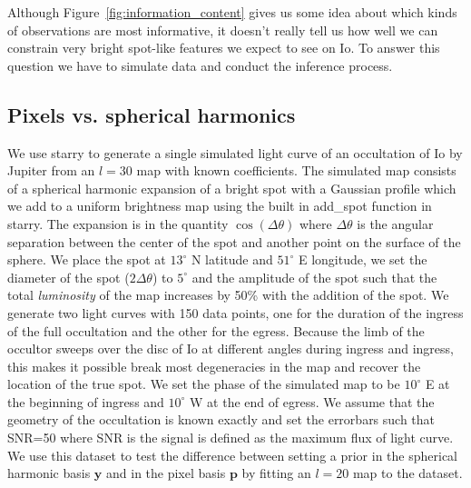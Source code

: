 \documentclass[modern]{aastex62}
\begin{document}
Although Figure~\ref{fig:information_content} gives us some idea about which kinds of observations are most informative, it doesn't really tell us how well we can constrain very bright spot-like features we expect to see on Io.
To answer this question we have to simulate data and conduct the inference process.

\subsection{Pixels vs. spherical harmonics}
\label{ssec:pixels_vs_harmonics}
We use \textsf{starry} to generate a single simulated light curve of an occultation of Io by Jupiter from an $l=30$ map with known coefficients.
The simulated map consists of a spherical harmonic expansion of a bright spot with a Gaussian profile which we add to a uniform brightness map using the built in \textsf{add\_spot} function in \textsf{starry}.
The expansion is in the quantity $\cos(\Delta\theta)$ where $\Delta\theta$ is the angular separation between the center of the spot and another point on the surface of the sphere. 
We place the spot at $13^\circ$ N latitude and $51^\circ$ E longitude, we set the diameter of the spot ($2\Delta\theta$) to $5^\circ$ and the amplitude of the spot such that the total \emph{luminosity} of the map increases by 50\% with the addition of the spot.
We generate two light curves with 150 data points, one for the duration of the ingress of the full occultation and the other for the egress.
Because the limb of the occultor sweeps over the disc of Io at different angles during ingress and ingress, this makes it possible break most degeneracies in the map and recover the location of the true spot.
We set the phase of the simulated map to be $10^\circ$ E at the beginning of ingress and $10^\circ$ W at the end of egress.
We assume that the geometry of the occultation is known exactly and set the errorbars such that SNR=50 where SNR is the signal is defined as the maximum flux of light curve.
    We use this dataset to test the difference between setting a prior in the spherical harmonic basis $\mathbf{y}$ and in the pixel basis $\mathbf{p}$ by fitting an $l=20$ map to the dataset.
\end{document}

